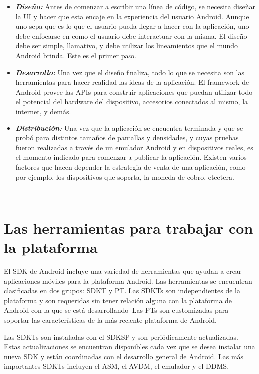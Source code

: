 \begin{itemize}
\item \textbf{\textit{Dise\~no:}} Antes de comenzar a escribir una l\'inea de c\'odigo, se necesita dise\~nar la \ac{UI} y hacer que esta encaje en la experiencia del usuario Android. Aunque uno sepa que es lo que el usuario pueda llegar a hacer con la aplicaci\'on, uno debe enfocarse en como el usuario debe interactuar con la misma. El dise\~no debe ser simple, llamativo, y debe utilizar los lineamientos que el mundo Android brinda. Este es el primer paso.

\item \textbf{\textit{Desarrollo:}} Una vez que el dise\~no finaliza, todo lo que se necesita son las herramientas para hacer realidad las ideas de la aplicaci\'on. El framework de Android provee las \ac{API}s para construir aplicaciones que puedan utilizar todo el potencial del hardware del dispositivo, accesorios conectados al mismo, la internet, y dem\'as. 

\item \textbf{\textit{Distribuci\'on:}} Una vez que la aplicaci\'on se encuentra terminada y que se prob\'o para distintos tama\~nos de pantallas y densidades, y cuyas pruebas fueron realizadas a trav\'es de un emulador Android y en dispositivos reales, es el momento indicado para comenzar a publicar la aplicaci\'on. Existen varios factores que hacen depender la estrategia de venta de una aplicaci\'on, como por ejemplo, los dispositivos que soporta, la moneda de cobro, etcetera.
\end{itemize}~\cite{and.dev.sdk}

\section{Las herramientas para trabajar con la plataforma}
\label{sec:android.tools.1}

El \ac{SDK} de Android incluye una variedad de herramientas que ayudan a crear aplicaciones m\'oviles para la plataforma Android. Las herramientas se encuentran clasificadas en dos grupos: \ac{SDKT} y \ac{PT}. Las \ac{SDKT}s  son independientes de la plataforma y son requeridas sin tener relaci\'on alguna con la plataforma de Android con la que se est\'a desarrollando. Las \ac{PT}s son customizadas para soportar las caracter\'isticas de la m\'as reciente plataforma de Android.

Las \ac{SDKT}s son instaladas con el \ac{SDKSP} y son peri\'odicamente actualizadas. Estas actualizaciones se encuentran disponibles cada vez que se desea instalar una nueva \ac{SDK} y están coordinadas con el desarrollo general de Android. Las m\'as importantes \ac{SDKT}s incluyen el \ac{ASM}, el \ac{AVDM}, el emulador y el \ac{DDMS}.

